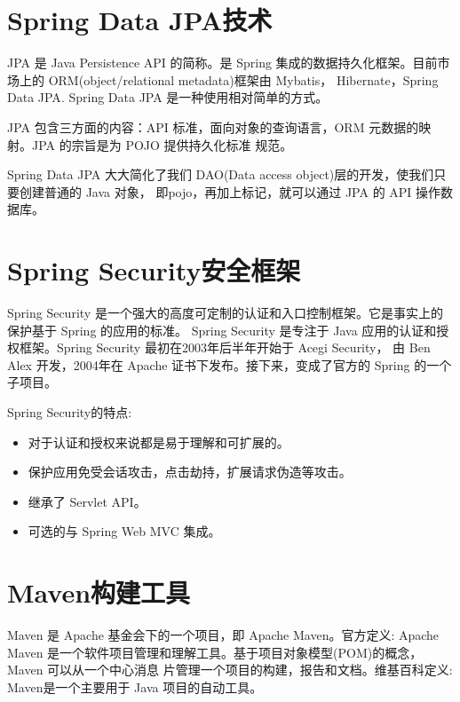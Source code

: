 \section{Spring Data JPA技术}
JPA 是 Java Persistence API 的简称。是 Spring 集成的数据持久化框架。目前市场上的 ORM(object/relational metadata)框架由 Mybatis，
Hibernate，Spring Data JPA\cite{SpringDataJPA2}. Spring Data JPA 是一种使用相对简单的方式。

JPA 包含三方面的内容：API 标准，面向对象的查询语言，ORM 元数据的映射。JPA 的宗旨是为 POJO 提供持久化标准
规范\cite{SpringDataJPA}。

Spring Data JPA 大大简化了我们 DAO(Data access object)层的开发，使我们只要创建普通的 Java 对象，
即pojo，再加上标记，就可以通过 JPA 的 API 操作数据库。

\section{Spring Security安全框架}
Spring Security\cite{SpringSecurity} 是一个强大的高度可定制的认证和入口控制框架。它是事实上的保护基于 Spring 的应用的标准。
Spring Security 是专注于 Java 应用的认证和授权框架。Spring Security 最初在2003年后半年开始于 Acegi Security， 
由 Ben Alex 开发，2004年在 Apache 证书下发布。接下来，变成了官方的 Spring 的一个子项目。

Spring Security的特点:

\begin{itemize}
    \item 对于认证和授权来说都是易于理解和可扩展的。
    \item 保护应用免受会话攻击，点击劫持，扩展请求伪造等攻击。
    \item 继承了 Servlet API。
    \item 可选的与 Spring Web MVC 集成。
\end{itemize}

\section{Maven构建工具}
Maven 是 Apache 基金会下的一个项目，即 Apache Maven。官方定义\cite{Maven}: Apache Maven 
是一个软件项目管理和理解工具。基于项目对象模型(POM)的概念，Maven 可以从一个中心消息
片管理一个项目的构建，报告和文档。维基百科定义\cite{WikiMaven}:
 Maven是一个主要用于 Java 项目的自动工具。



